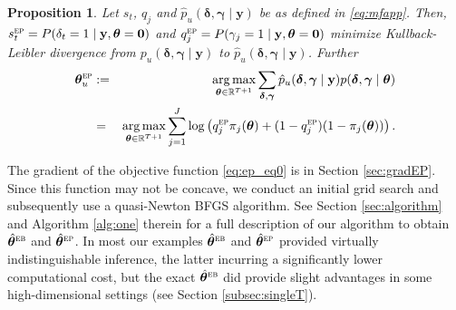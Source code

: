 \documentclass[12pt]{article}
\def\cred{\textcolor{red}}
\newcommand{\mb}[1]{\mathbf{#1}}
\DeclareMathOperator*{\argmax}{arg\,max}
\newcommand{\by}{{\mb{y}}}
\newcommand{\bgamma}{{\bm{\gamma}}}
\newcommand{\bdelta}{{\bm{\delta}}}
\newcommand{\btheta}{{\bm{\theta}}}
\newcommand{\bthetaep}{\btheta^{\textsc{ep}}}
\newcommand{\hthetaeb}{\hat{\btheta}^{\textsc{eb}}}
\newcommand{\hthetaep}{\hat{\btheta}^{\textsc{ep}}}
\newtheorem{prop}[thm]{Proposition}
\newcommand{\omcom}[1]{ {\color{blue} #1} }
\begin{document}
\begin{prop}  \label{prop:three}
Let $s_t$, $q_j$ and $\hat{p}_u(\bdelta,\bgamma \mid \by)$ be as defined in \eqref{eq:mfapp}. Then, $s_{t}^{\textsc{ep}} = P(\delta_{t} = 1 \mid \by, \btheta = \mb{0})$ and $q_{j}^{\textsc{ep}} = P(\gamma_{j} = 1 \mid \by, \btheta = \mb{0})$ minimize Kullback-Leibler divergence from $p_{u}(\bdelta, \bgamma \mid \by)$ to $\hat{p}_u(\bdelta,\bgamma \mid \by)$. Further
\begin{eqnarray}
\bthetaep_{u} &:=& \argmax_{\btheta \in \mathbb{R}^{T+1}} \sum_{\bdelta, \bgamma} \hat{p}_{u}(\bdelta, \bgamma \mid \by) p(\bdelta, \bgamma \mid \btheta) \nonumber \\
&=& \argmax_{\btheta \in \mathbb{R}^{T+1}} \sum_{j=1}^{J} \log \left( q_{j}^{\textsc{ep}} \pi_j(\btheta) + (1-q_{j}^{\textsc{ep}}) (1-\pi_j(\btheta)) \right). \label{eq:ep_eq0}
\end{eqnarray}
\end{prop}
The gradient of the objective function \eqref{eq:ep_eq0} is in Section \ref{sec:gradEP}.
Since this function may not be concave, we conduct an initial grid search and subsequently use a quasi-Newton BFGS algorithm. See Section \ref{sec:algorithm} and Algorithm \ref{alg:one} therein for a full description of our algorithm to obtain $\hthetaeb$ and $\hthetaep$.
In most our examples $\hthetaeb$ and $\hthetaep$ provided virtually indistinguishable inference, the latter incurring a significantly lower computational cost, but the exact $\hthetaeb$ did provide slight advantages in some high-dimensional settings (see Section \ref{subsec:singleT}).
\end{document}
